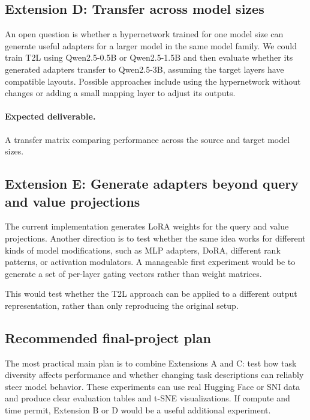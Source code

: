 \documentclass{article}
\begin{document}
\subsection{Extension D: Transfer across model sizes}

An open question is whether a hypernetwork trained for one model size can generate useful adapters for a larger model in the same model family. We could train T2L using Qwen2.5-0.5B or Qwen2.5-1.5B and then evaluate whether its generated adapters transfer to Qwen2.5-3B, assuming the target layers have compatible layouts. Possible approaches include using the hypernetwork without changes or adding a small mapping layer to adjust its outputs.

\paragraph{Expected deliverable.}
A transfer matrix comparing performance across the source and target model sizes.

\subsection{Extension E: Generate adapters beyond query and value projections}

The current implementation generates LoRA weights for the query and value projections. Another direction is to test whether the same idea works for different kinds of model modifications, such as MLP adapters, DoRA, different rank patterns, or activation modulators. A manageable first experiment would be to generate a set of per-layer gating vectors rather than weight matrices.

This would test whether the T2L approach can be applied to a different output representation, rather than only reproducing the original setup.

\subsection{Recommended final-project plan}

The most practical main plan is to combine Extensions A and C: test how task diversity affects performance and whether changing task descriptions can reliably steer model behavior. These experiments can use real Hugging Face or SNI data and produce clear evaluation tables and t-SNE visualizations. If compute and time permit, Extension B or D would be a useful additional experiment.
\end{document}
